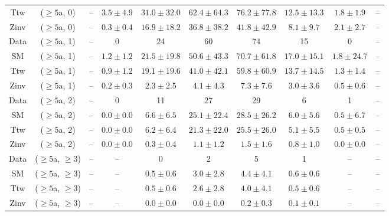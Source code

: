 \begin{table}[h!]
{\begin{tabular}{cccccccccc}
	Ttw & ($\ge5$a, 0) & -- & $3.5\pm 4.9$ & $31.0\pm 32.0$ & $62.4\pm 64.3$ & $76.2\pm 77.8$ & $12.5\pm 13.3$ & $1.8\pm 1.9$ & -- \\[0.5ex] 
	Zinv & ($\ge5$a, 0) & -- & $0.3\pm 0.4$ & $16.9\pm 18.2$ & $36.8\pm 38.2$ & $41.8\pm 42.9$ & $8.1\pm 9.7$ & $2.1\pm 2.7$ & -- \\[0.5ex] 
	Data & ($\ge5$a, 1) & -- & 0 & 24 & 60 & 74 & 15 & 0 & -- \\[0.5ex] 
	SM & ($\ge5$a, 1) & -- & $1.2\pm 1.2$ & $21.5\pm 19.8$ & $50.6\pm 43.3$ & $70.7\pm 61.8$ & $17.0\pm 15.1$ & $1.8\pm 24.7$ & -- \\[0.5ex] 
	Ttw & ($\ge5$a, 1) & -- & $0.9\pm 1.2$ & $19.1\pm 19.6$ & $41.0\pm 42.1$ & $59.8\pm 60.9$ & $13.7\pm 14.5$ & $1.3\pm 1.4$ & -- \\[0.5ex] 
	Zinv & ($\ge5$a, 1) & -- & $0.2\pm 0.3$ & $2.3\pm 2.5$ & $4.1\pm 4.3$ & $7.3\pm 7.6$ & $3.0\pm 3.6$ & $0.5\pm 0.6$ & -- \\[0.5ex] 
	Data & ($\ge5$a, 2) & -- & 0 & 11 & 27 & 29 & 6 & 1 & -- \\[0.5ex] 
	SM & ($\ge5$a, 2) & -- & $0.0\pm 0.0$ & $6.6\pm 6.5$ & $25.1\pm 22.4$ & $28.5\pm 26.2$ & $6.0\pm 5.6$ & $0.5\pm 6.7$ & -- \\[0.5ex] 
	Ttw & ($\ge5$a, 2) & -- & $0.0\pm 0.0$ & $6.2\pm 6.4$ & $21.3\pm 22.0$ & $25.5\pm 26.0$ & $5.1\pm 5.5$ & $0.5\pm 0.5$ & -- \\[0.5ex] 
	Zinv & ($\ge5$a, 2) & -- & $0.0\pm 0.0$ & $0.3\pm 0.4$ & $1.1\pm 1.2$ & $1.5\pm 1.6$ & $0.8\pm 1.0$ & $0.0\pm 0.0$ & -- \\[0.5ex] 
	Data & ($\ge5$a, $\ge3$) & -- & -- & 0 & 2 & 5 & 1 & -- & -- \\[0.5ex] 
	SM & ($\ge5$a, $\ge3$) & -- & -- & $0.5\pm 0.6$ & $3.0\pm 2.8$ & $4.4\pm 4.1$ & $0.6\pm 0.6$ & -- & -- \\[0.5ex] 
	Ttw & ($\ge5$a, $\ge3$) & -- & -- & $0.5\pm 0.6$ & $2.6\pm 2.8$ & $4.0\pm 4.1$ & $0.5\pm 0.6$ & -- & -- \\[0.5ex] 
	Zinv & ($\ge5$a, $\ge3$) & -- & -- & $0.0\pm 0.0$ & $0.0\pm 0.0$ & $0.2\pm 0.3$ & $0.1\pm 0.1$ & -- & -- \\[0.5ex] 
	\hline
	\hline
\end{tabular}}
\end{table}
